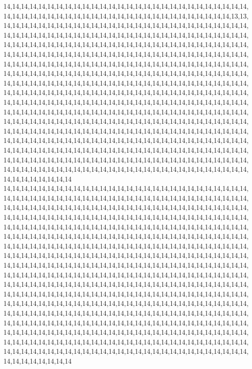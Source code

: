 14,14,14,14,14,14,14,14,14,14,14,14,14,14,14,14,14,14,14,14,14,14,14,14,14,14,14,14,14,14,14,14,14,14,14,14,14,14,14,14,14,14,14,14,14,14,14,14,14,14,14,14,14,14,13,13,14,14,14,14,14,14,14,14,14,14,14,14,14,14,14,14,14,14,14,14,14,14,14,14,14,14,14,14,14,14,14,14,14,14,14,14,14,14,14,14,14,14,14,14,14,14,14,14,14,14,14,14,14,14,14,14,14,14,14,14,14,14,14,14,14,14,14,14,14,14,14,14,14,14,14,14,14,14,14,14,14,14,14,14,14,14,14,14,14,14,14,14,14,14,14,14,14,14,14,14,14,14,14,14,14,14,14,14,14,14,14,14,14,14,14,14,14,14,14,14,14,14,14,14,14,14,14,14,14,14,14,14,14,14,14,14,14,14,14,14,14,14,14,14,14,14,14,14,14,14,14,14,14,14,14,14,14,14,14,14,14,14,14,14,14,14,14,14,14,14,14,14,14,14,14,14,14,14,14,14,14,14,14,14,14,14,14,14,14,14,14,14,14,14,14,14,14,14,14,14,14,14,14,14,14,14,14,14,14,14,14,14,14,14,14,14,14,14,14,14,14,14,14,14,14,14,14,14,14,14,14,14,14,14,14,14,14,14,14,14,14,14,14,14,14,14,14,14,14,14,14,14,14,14,14,14,14,14,14,14,14,14,14,14,14,14,14,14,14,14,14,14,14,14,14,14,14,14,14,14,14,14,14,14,14,14,14,14,14,14,14,14,14,14,14,14,14,14,14,14,14,14,14,14,14,14,14,14,14,14,14,14,14,14,14,14,14,14,14,14,14,14,14,14,14,14,14,14,14,14,14,14,14,14,14,14,14,14,14,14,14,14,14,14,14,14,14,14,14,14,14,14,14,14,14,14,14,14,14,14,14,14,14,14,14,14,14,14,14,14,14,14,14,14,14,14,14,14,14,14,14,14,14,14,14,14,14,14,14,14,14,14,14,14,14,14,14,14,14,14,14,14,14,14,14,14,14,14,14,14,14,14,14,14,14,14,14,14,14,14,14,14,14,14,14,14,14,14,14,14,14,14,14,14,14,14,14,14,14,14,14,14,14,14,14,14,14,14,14,14,14,14,14,14,14,14
14,14,14,14,14,14,14,14,14,14,14,14,14,14,14,14,14,14,14,14,14,14,14,14,14,14,14,14,14,14,14,14,14,14,14,14,14,14,14,14,14,14,14,14,14,14,14,14,14,14,14,14,14,14,14,14,14,14,14,14,14,14,14,14,14,14,14,14,14,14,14,14,14,14,14,14,14,14,14,14,14,14,14,14,14,14,14,14,14,14,14,14,14,14,14,14,14,14,14,14,14,14,14,14,14,14,14,14,14,14,14,14,14,14,14,14,14,14,14,14,14,14,14,14,14,14,14,14,14,14,14,14,14,14,14,14,14,14,14,14,14,14,14,14,14,14,14,14,14,14,14,14,14,14,14,14,14,14,14,14,14,14,14,14,14,14,14,14,14,14,14,14,14,14,14,14,14,14,14,14,14,14,14,14,14,14,14,14,14,14,14,14,14,14,14,14,14,14,14,14,14,14,14,14,14,14,14,14,14,14,14,14,14,14,14,14,14,14,14,14,14,14,14,14,14,14,14,14,14,14,14,14,14,14,14,14,14,14,14,14,14,14,14,14,14,14,14,14,14,14,14,14,14,14,14,14,14,14,14,14,14,14,14,14,14,14,14,14,14,14,14,14,14,14,14,14,14,14,14,14,14,14,14,14,14,14,14,14,14,14,14,14,14,14,14,14,14,14,14,14,14,14,14,14,14,14,14,14,14,14,14,14,14,14,14,14,14,14,14,14,14,14,14,14,14,14,14,14,14,14,14,14,14,14,14,14,14,14,14,14,14,14,14,14,14,14,14,14,14,14,14,14,14,14,14,14,14,14,14,14,14,14,14,14,14,14,14,14,14,14,14,14,14,14,14,14,14,14,14,14,14,14,14,14,14,14,14,14,14,14,14,14,14,14,14,14,14,14,14,14,14,14,14,14,14,14,14,14,14,14,14,14,14,14,14,14,14,14,14,14,14,14,14,14,14,14,14,14,14,14,14,14,14,14,14,14,14,14,14,14,14,14,14,14,14,14,14,14,14,14,14,14,14,14,14,14,14,14,14,14,14,14,14,14,14,14,14,14,14,14,14,14,14,14,14,14,14,14,14,14,14,14,14,14,14,14,14,14,14,14,14,14,14,14,14,14,14,14,14,14,14,14,14,14,14,14,14,14,14,14,14,14
